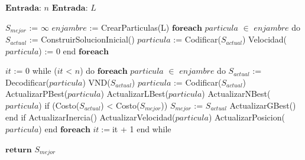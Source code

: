 \begin{code}[includerangemarker=false,frame=single,label=alg:MPSO,caption=Pseudocódigo de PSO-M,firstnumber=100, mathescape]
$\textbf{Entrada}$: $n$
$\textbf{Entrada}$: $L$

$S_{mejor}$ := $\infty$
$enjambre$ := CrearParticulas(L)
$\textbf{foreach}$ $particula$ $\in$ $enjambre$ do
	$S_{actual}$ := ConstruirSolucionInicial()	
	$particula$ := Codificar($S_{actual}$)
	Velocidad($particula$) := 0
end $\textbf{foreach}$

$it$ := 0
while ($it$ < $n$) do
	$\textbf{foreach}$ $particula$ $\in$ $enjambre$ do
		$S_{actual}$ := Decodificar($particula$)
		VND($S_{actual}$)
		$particula$ := Codificar($S_{actual}$)
		ActualizarPBest($particula$)
		ActualizarLBest($particula$)
		ActualizarNBest($particula$)
		if (Costo($S_{actual}$) < Costo($S_{mejor}$))
			$S_{mejor}$ := $S_{actual}$
			ActualizarGBest()
		end if
		ActualizarInercia()
		ActualizarVelocidad($particula$)				
		ActualizarPosicion($particula$)
	end $\textbf{foreach}$
	$it := $it + 1
end while

$\textbf{return}$ $S_{mejor}$	
\end{code}